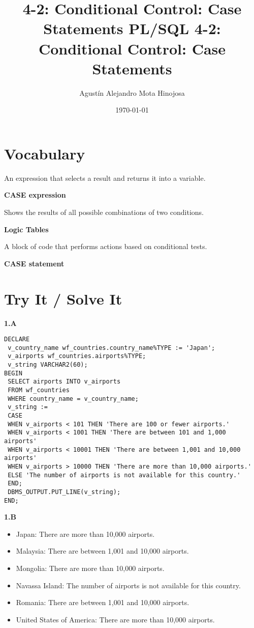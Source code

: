 \documentclass[11pt]{article}
\author{Agustín Alejandro Mota Hinojosa}
\date{\today}
\title{4-2: Conditional Control: Case Statements PL/SQL 4-2: Conditional Control: Case Statements}
\begin{document}
\maketitle
\tableofcontents

\section{Vocabulary}
\label{sec:orgbc7f163}

An expression that selects a result and returns it into a variable.

\textbf{CASE expression}

Shows the results of all possible combinations of two conditions.

\textbf{Logic Tables}

A block of code that performs actions based on conditional tests.

\textbf{CASE statement}
\section{Try It / Solve It}
\label{sec:orgedcbdae}

\textbf{1.A}

\begin{verbatim}
DECLARE
 v_country_name wf_countries.country_name%TYPE := 'Japan';
 v_airports wf_countries.airports%TYPE;
 v_string VARCHAR2(60);
BEGIN
 SELECT airports INTO v_airports
 FROM wf_countries
 WHERE country_name = v_country_name;
 v_string :=
 CASE
 WHEN v_airports < 101 THEN 'There are 100 or fewer airports.'
 WHEN v_airports < 1001 THEN 'There are between 101 and 1,000 airports'
 WHEN v_airports < 10001 THEN 'There are between 1,001 and 10,000 airports'
 WHEN v_airports > 10000 THEN 'There are more than 10,000 airports.'
 ELSE 'The number of airports is not available for this country.'
 END;
 DBMS_OUTPUT.PUT_LINE(v_string);
END;
\end{verbatim}

\textbf{1.B}

\begin{itemize}
\item Japan: There are more than 10,000 airports.
\item Malaysia: There are between 1,001 and 10,000 airports.
\item Mongolia: There are more than 10,000 airports.
\item Navassa Island: The number of airports is not available for this country.
\item Romania: There are between 1,001 and 10,000 airports.
\item United States of America: There are more than 10,000 airports.
\end{itemize}
\end{document}
